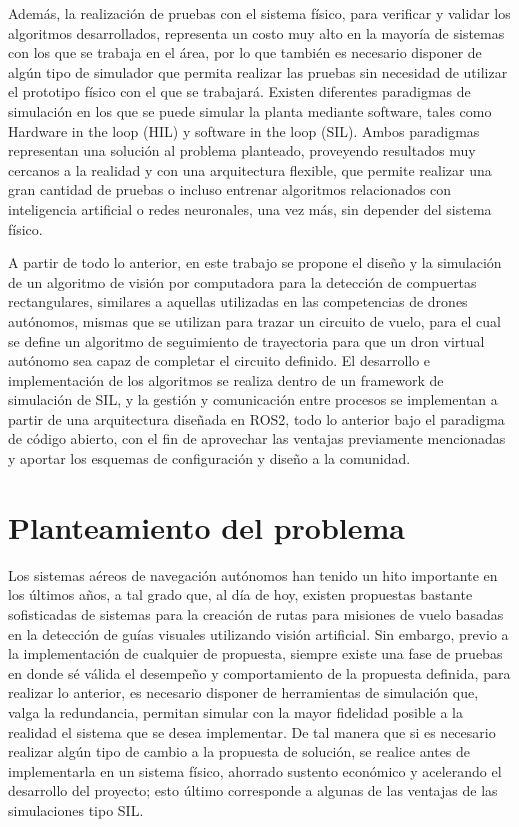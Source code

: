 Además, la realización de pruebas con el sistema físico, para verificar y validar los algoritmos desarrollados, representa un costo muy alto en la mayoría de sistemas con los que se trabaja en el área, por lo que también es necesario disponer de algún tipo de simulador que permita realizar las pruebas sin necesidad de utilizar el prototipo físico con el que se trabajará. Existen diferentes paradigmas de simulación en los que se puede simular la planta mediante software, tales como Hardware in the loop (HIL) y software in the loop (SIL). Ambos paradigmas representan una solución al problema planteado, proveyendo resultados muy cercanos a la realidad y con una arquitectura flexible, que permite realizar una gran cantidad de pruebas o incluso entrenar algoritmos relacionados con inteligencia artificial o redes neuronales, una vez más, sin depender del sistema físico. 

A partir de todo lo anterior, en este trabajo se propone el diseño y la simulación de un algoritmo de visión por computadora para la detección de compuertas rectangulares, similares a aquellas utilizadas en las competencias de drones autónomos, mismas que se utilizan para trazar un circuito de vuelo, para el cual se define un algoritmo de seguimiento de trayectoria para que un dron virtual autónomo sea capaz de completar el circuito definido.  El desarrollo e implementación de los algoritmos se realiza dentro de un framework de simulación de SIL, y la gestión y comunicación entre procesos se implementan a partir de una arquitectura diseñada en ROS2, todo lo anterior bajo el paradigma de código abierto, con el fin de aprovechar las ventajas previamente mencionadas y aportar los esquemas de configuración y diseño a la comunidad.


\section{Planteamiento del problema}
Los sistemas aéreos de navegación autónomos han tenido un hito importante en los últimos años, a tal grado que, al día de hoy, existen propuestas bastante sofisticadas de sistemas para la creación de rutas para misiones de vuelo basadas en la detección de guías visuales utilizando visión artificial. Sin embargo, previo a la implementación de cualquier de propuesta, siempre existe una fase de pruebas en donde sé válida el desempeño y comportamiento de la propuesta definida, para realizar lo anterior, es necesario disponer de herramientas de simulación que, valga la redundancia, permitan simular con la mayor fidelidad posible a la realidad el sistema que se desea implementar. De tal manera que si es necesario realizar algún tipo de cambio a la propuesta de solución, se realice antes de implementarla en un sistema físico, ahorrado sustento económico y acelerando el desarrollo del proyecto; esto último corresponde a algunas de las ventajas de las simulaciones tipo SIL. 


